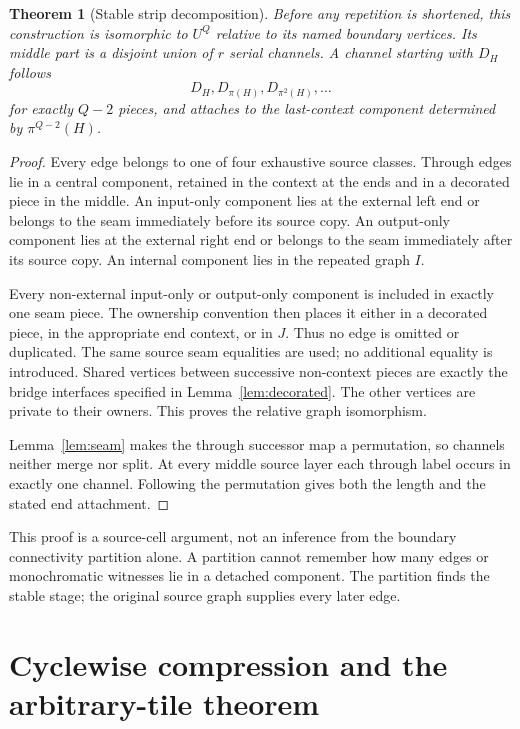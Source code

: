 \documentclass[11pt]{article}
\newtheorem{theorem}{Theorem}[section]
\theoremstyle{remark}\newtheorem{remark}[theorem]{Remark}
\begin{document}
\begin{theorem}[Stable strip decomposition]\label{thm:strip}
Before any repetition is shortened, this construction is isomorphic to $U^Q$ relative to its named boundary vertices. Its middle part is a disjoint union of $r$ serial channels. A channel starting with $D_H$ follows
\[
 D_H,D_{\pi(H)},D_{\pi^2(H)},\ldots
\]
for exactly $Q-2$ pieces, and attaches to the last-context component determined by $\pi^{Q-2}(H)$.
\end{theorem}
\begin{proof}
Every edge belongs to one of four exhaustive source classes. Through edges lie in a central component, retained in the context at the ends and in a decorated piece in the middle. An input-only component lies at the external left end or belongs to the seam immediately before its source copy. An output-only component lies at the external right end or belongs to the seam immediately after its source copy. An internal component lies in the repeated graph $I$.

Every non-external input-only or output-only component is included in exactly one seam piece. The ownership convention then places it either in a decorated piece, in the appropriate end context, or in $J$. Thus no edge is omitted or duplicated. The same source seam equalities are used; no additional equality is introduced. Shared vertices between successive non-context pieces are exactly the bridge interfaces specified in Lemma~\ref{lem:decorated}. The other vertices are private to their owners. This proves the relative graph isomorphism.

Lemma~\ref{lem:seam} makes the through successor map a permutation, so channels neither merge nor split. At every middle source layer each through label occurs in exactly one channel. Following the permutation gives both the length and the stated end attachment.
\end{proof}

This proof is a source-cell argument, not an inference from the boundary connectivity partition alone. A partition cannot remember how many edges or monochromatic witnesses lie in a detached component. The partition finds the stable stage; the original source graph supplies every later edge.

\section{Cyclewise compression and the arbitrary-tile theorem}
\end{document}

